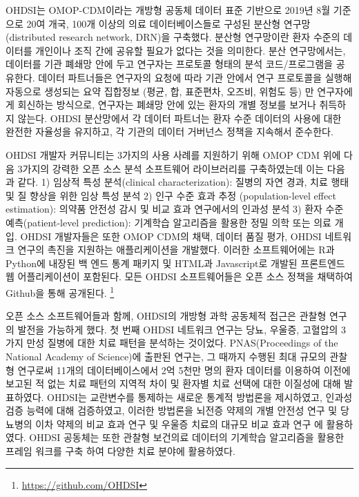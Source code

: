 \documentclass[11pt]{book}
\let\rmarkdownfootnote\footnote%
\def\footnote{\protect\rmarkdownfootnote}
\theoremstyle{definition}
\theoremstyle{definition}
\theoremstyle{definition}
\theoremstyle{remark}
\begin{document}
OHDSI는 OMOP-CDM이라는 개방형 공동체 데이터 표준 기반으로 2019년 8월
기준으로 20여 개국, 100개 이상의 의료 데이터베이스들로 구성된 분산형
연구망(distributed research network, DRN)을 구축했다. 분산형 연구망이란
환자 수준의 데이터를 개인이나 조직 간에 공유할 필요가 없다는 것을
의미한다. 분산 연구망에서는, 데이터를 기관 폐쇄망 안에 두고 연구자는
프로토콜 형태의 분석 코드/프로그램을 공유한다. 데이터 파트너들은
연구자의 요청에 따라 기관 안에서 연구 프로토콜을 실행해 자동으로
생성되는 요약 집합정보 (평균, 합, 표준편차, 오즈비, 위험도 등) 만
연구자에게 회신하는 방식으로, 연구자는 폐쇄망 안에 있는 환자의 개별
정보를 보거나 취득하지 않는다. OHDSI 분산망에서 각 데이터 파트너는 환자
수준 데이터의 사용에 대한 완전한 자율성을 유지하고, 각 기관의 데이터
거버넌스 정책을 지속해서 준수한다.

OHDSI 개발자 커뮤니티는 3가지의 사용 사례를 지원하기 위해 OMOP CDM 위에
다음 3가지의 강력한 오픈 소스 분석 소프트웨어 라이브러리를 구축하였는데
이는 다음과 같다. 1) 임상적 특성 분석(clinical characterization): 질병의
자연 경과, 치료 행태 및 질 향상을 위한 임상 특성 분석 2) 인구 수준 효과
추정 (population-level effect estimation): 의약품 안전성 감시 및 비교
효과 연구에서의 인과성 분석 3) 환자 수준 예측(patient-level prediction):
기계학습 알고리즘을 활용한 정밀 의학 또는 의료 개입. OHDSI 개발자들은
또한 OMOP CDM의 채택, 데이터 품질 평가, OHDSI 네트워크 연구의 촉진을
지원하는 애플리케이션을 개발했다. 이러한 소프트웨어에는 R과 Python에
내장된 백 엔드 통계 패키지 및 HTML과 Javascript로 개발된 프론트엔드 웹
어플리케이션이 포함된다. 모든 OHDSI 소프트웨어들은 오픈 소스 정책을
채택하여 Github을 통해 공개된다. \footnote{\url{https://github.com/OHDSI}}

오픈 소스 소프트웨어들과 함께, OHDSI의 개방형 과학 공동체적 접근은
관찰형 연구의 발전을 가능하게 했다. 첫 번째 OHDSI 네트워크 연구는 당뇨,
우울증, 고혈압의 3가지 만성 질병에 대한 치료 패턴을 분석하는 것이었다.
PNAS(Proceedings of the National Academy of Science)에 출판된 연구는, 그
때까지 수행된 최대 규모의 관찰형 연구로써 11개의 데이터베이스에서 2억
5천만 명의 환자 데이터를 이용하여 이전에 보고된 적 없는 치료 패턴의
지역적 차이 및 환자별 치료 선택에 대한 이질성에 대해 발표하였다.
\citep{Hripcsak7329} OHDSI는 교란변수를 통제하는 새로운 통계적 방법론을
제시하였고, \citep{tian_2018} 인과성 검증 능력에 대해 검증하였고,
\citep{schuemie_2018} 이러한 방법론을 뇌전증 약제의 개별 안전성 연구
\citep{duke_2017} 및 당뇨병의 이차 약제의 비교 효과 연구
\citep{vashisht_2018} 및 우울증 치료의 대규모 비교 효과 연구
\citep{schuemie_2018b} 에 활용하였다. OHDSI 공동체는 또한 관찰형
보건의료 데이터의 기계학습 알고리즘을 활용한 프레임 워크를 구축
\citep{reps2018} 하여 다양한 치료 분야에 활용하였다.
\citep{johnston_2019, cepeda_2018, reps_2019}
\end{document}
